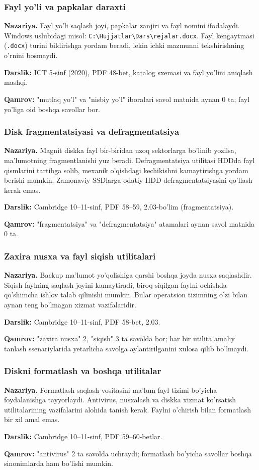 \documentclass[10pt,a4paper]{article}
\begin{document}
\subsubsection*{Fayl yo'li va papkalar daraxti}
\textbf{Nazariya.} Fayl yo'li saqlash joyi, papkalar zanjiri va
fayl nomini ifodalaydi. Windows uslubidagi misol:
\texttt{C:\textbackslash{}Hujjatlar\textbackslash{}Dars\textbackslash{}rejalar.docx}.
Fayl kengaytmasi (\texttt{.docx}) turini bildirishga yordam beradi,
lekin ichki mazmunni tekshirishning o'rnini bosmaydi.
\par\textbf{Darslik:} ICT 5-sinf (2020), PDF 48-bet,
katalog sxemasi va fayl yo'lini aniqlash mashqi.
\par\textbf{Qamrov:} "mutlaq yo'l" va "nisbiy yo'l" iboralari
savol matnida aynan 0 ta; fayl yo'liga oid boshqa savollar bor.
\subsubsection*{Disk fragmentatsiyasi va defragmentatsiya}
\textbf{Nazariya.} Magnit diskka fayl bir-biridan uzoq
sektorlarga bo'linib yozilsa, ma'lumotning fragmentlanishi
yuz beradi. Defragmentatsiya utilitasi HDDda fayl
qismlarini tartibga solib, mexanik o'qishdagi kechikishni
kamaytirishga yordam berishi mumkin. Zamonaviy SSDlarga
odatiy HDD defragmentatsiyasini qo'llash kerak emas.
\par\textbf{Darslik:} Cambridge 10--11-sinf, PDF 58--59,
2.03-bo'lim (fragmentatsiya).
\par\textbf{Qamrov:} "fragmentatsiya" va "defragmentatsiya"
atamalari aynan savol matnida 0 ta.
\subsubsection*{Zaxira nusxa va fayl siqish utilitalari}
\textbf{Nazariya.} Backup ma'lumot yo'qolishiga qarshi boshqa
joyda nusxa saqlashdir. Siqish faylning saqlash joyini
kamaytiradi, biroq siqilgan faylni ochishda qo'shimcha
ishlov talab qilinishi mumkin. Bular operatsion tizimning
o'zi bilan aynan teng bo'lmagan xizmat vazifalaridir.
\par\textbf{Darslik:} Cambridge 10--11-sinf, PDF 58-bet, 2.03.
\par\textbf{Qamrov:} "zaxira nusxa" 2, "siqish" 3 ta savolda bor;
har bir utilita amaliy tanlash ssenariylarida yetarlicha
savolga aylantirilganini xulosa qilib bo'lmaydi.
\subsubsection*{Diskni formatlash va boshqa utilitalar}
\textbf{Nazariya.} Formatlash saqlash vositasini ma'lum
fayl tizimi bo'yicha foydalanishga tayyorlaydi.
Antivirus, nusxalash va diskka xizmat ko'rsatish
utilitalarining vazifalarini alohida tanish kerak.
Faylni o'chirish bilan formatlash bir xil amal emas.
\par\textbf{Darslik:} Cambridge 10--11-sinf, PDF 59--60-betlar.
\par\textbf{Qamrov:} "antivirus" 2 ta savolda uchraydi;
formatlash bo'yicha savollar boshqa sinonimlarda ham bo'lishi mumkin.
\end{document}
